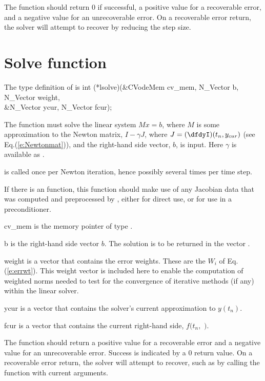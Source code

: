 {
  The  function should return 0 if successful,            
  a positive value for a recoverable error, and a negative value  
  for an unrecoverable error.  On a recoverable error return, the solver
  will attempt to recover by reducing the step size.
}
{}


\section{Solve function}
The type definition of  is
{
  int (*lsolve)(&CVodeMem cv\_mem, N\_Vector b, N\_Vector weight, \\
                &N\_Vector ycur, N\_Vector fcur);  
}
{
  The function  must solve the linear system $M x = b$, where         
  $M$ is some approximation to the Newton matrix, $I - \gamma J$, where
  $J = (\dfdyI)(t_n, y_{cur})$ (see Eq.(\ref{e:Newtonmat})),
  and the right-hand side vector, $b$, is input.
  Here $\gamma$ is available as .

   is called once per Newton iteration, hence possibly
  several times per time step.

  If there is an  function, this  function should
  make use of any Jacobian data that was computed and preprocessed
  by , either for direct use, or for use in a preconditioner.
}
{
  \begin{args}[cv\_mem]
  \item[cv\_mem]
    is the {\cvodes} memory pointer of type .
  \item[b]
    is the right-hand side vector $b$. The solution is to be    
    returned in the vector .
  \item[weight]
    is a vector that contains the error weights.
    These are the $W_i$ of Eq.(\ref{e:errwt}).
    This weight vector is included here to enable the computation of
    weighted norms needed to test for the convergence of iterative methods
    (if any) within the linear solver.
  \item[ycur]
    is a vector that contains the solver's current approximation to $y(t_n)$.
  \item[fcur]
    is a vector that contains the current right-hand side, $f(t_n,$ $)$. 
  \end{args}
}
{
  The  function should return a positive value    
  for a recoverable error and a negative value for an             
  unrecoverable error. Success is indicated by a 0 return value.
  On a recoverable error return, the solver will attempt to recover, such
  as by calling the  function with current arguments.
}
{}

